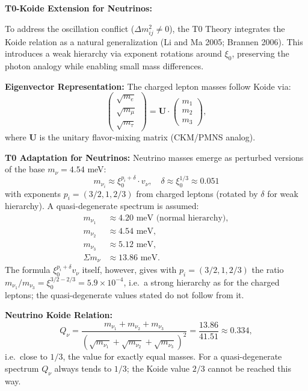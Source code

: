 	\begin{koidebox}
		\textbf{T0-Koide Extension for Neutrinos:}
		
		To address the oscillation conflict ($\Delta m^2_{ij} \neq 0$), the T0 Theory integrates the Koide relation as a natural generalization (Li and Ma 2005; Brannen 2006). This introduces a weak hierarchy via exponent rotations around $\xi_0$, preserving the photon analogy while enabling small mass differences.
		
		\textbf{Eigenvector Representation:}
		The charged lepton masses follow Koide via:
		\begin{equation}
			\begin{pmatrix}
				\sqrt{m_e} \\
				\sqrt{m_\mu} \\
				\sqrt{m_\tau}
			\end{pmatrix}
			= \mathbf{U} \cdot \begin{pmatrix}
				m_1 \\
				m_2 \\
				m_3
			\end{pmatrix},
		\end{equation}
		where $\mathbf{U}$ is the unitary flavor-mixing matrix (CKM/PMNS analog).
		
		\textbf{T0 Adaptation for Neutrinos:}
		Neutrino masses emerge as perturbed versions of the base $m_\nu = 4.54$ meV:
		\begin{equation}
			m_{\nu_i} \approx \xi_0^{p_i + \delta} \cdot v_\nu, \quad \delta \approx \xi_0^{1/3} \approx 0.051
		\end{equation}
		with exponents $p_i = (3/2, 1, 2/3)$ from charged leptons (rotated by $\delta$ for weak hierarchy). A quasi-degenerate spectrum is assumed:
		\begin{align}
			m_{\nu_1} &\approx 4.20 \text{ meV (normal hierarchy)}, \\
			m_{\nu_2} &\approx 4.54 \text{ meV}, \\
			m_{\nu_3} &\approx 5.12 \text{ meV}, \\
			\Sigma m_\nu &\approx 13.86 \text{ meV}.
		\end{align}
		The formula $\xi_0^{p_i+\delta} v_\nu$ itself, however, gives with $p_i = (3/2, 1, 2/3)$ the ratio $m_{\nu_1}/m_{\nu_3} = \xi_0^{3/2-2/3} = 5.9 \times 10^{-4}$, i.e.\ a strong hierarchy as for the charged leptons; the quasi-degenerate values stated do not follow from it.
		
		\textbf{Neutrino Koide Relation:}
		\begin{equation}
			Q_\nu = \frac{m_{\nu_1} + m_{\nu_2} + m_{\nu_3}}{\left( \sqrt{m_{\nu_1}} + \sqrt{m_{\nu_2}} + \sqrt{m_{\nu_3}} \right)^2} = \frac{13.86}{41.51} \approx 0.334,
		\end{equation}
		i.e.\ close to $1/3$, the value for exactly equal masses.
		For a quasi-degenerate spectrum $Q_\nu$ always tends to $1/3$; the Koide value $2/3$ cannot be reached this way.
		

\end{koidebox}
